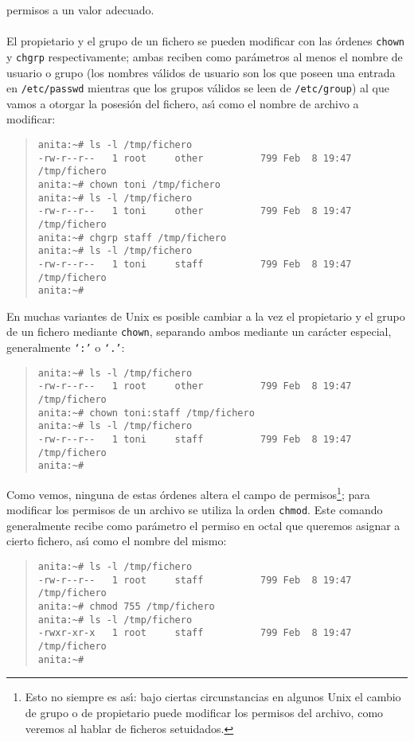 permisos a un valor adecuado.\\
\\El propietario y el grupo de un fichero se pueden modificar con las \'ordenes
{\tt chown} y {\tt chgrp} respectivamente; ambas reciben como par\'ametros al
menos el nombre de usuario o grupo (los nombres v\'alidos de usuario
son los que poseen una entrada en {\tt /etc/passwd} mientras que los grupos
v\'alidos se leen de {\tt /etc/group}) al que vamos a otorgar la posesi\'on
del fichero, as\'{\i} como el nombre de archivo a modificar:
\begin{quote}
\begin{verbatim}
anita:~# ls -l /tmp/fichero 
-rw-r--r--   1 root     other          799 Feb  8 19:47 /tmp/fichero
anita:~# chown toni /tmp/fichero
anita:~# ls -l /tmp/fichero 
-rw-r--r--   1 toni     other          799 Feb  8 19:47 /tmp/fichero
anita:~# chgrp staff /tmp/fichero
anita:~# ls -l /tmp/fichero 
-rw-r--r--   1 toni     staff          799 Feb  8 19:47 /tmp/fichero
anita:~# 
\end{verbatim}
\end{quote}
En muchas variantes de Unix es posible cambiar a la vez el propietario y el
grupo de un fichero mediante {\tt chown}, separando ambos mediante un car\'acter
especial, generalmente {\tt `:'} o {\tt `.'}:
\begin{quote}
\begin{verbatim}
anita:~# ls -l /tmp/fichero 
-rw-r--r--   1 root     other          799 Feb  8 19:47 /tmp/fichero
anita:~# chown toni:staff /tmp/fichero
anita:~# ls -l /tmp/fichero 
-rw-r--r--   1 toni     staff          799 Feb  8 19:47 /tmp/fichero
anita:~#
\end{verbatim}
\end{quote}
Como vemos, ninguna de estas \'ordenes altera el campo de permisos\footnote{Esto
no siempre es as\'{\i}: bajo ciertas circunstancias en algunos Unix el cambio
de grupo o de propietario puede modificar los permisos del archivo, como veremos
al hablar de  ficheros setuidados.}; para modificar los permisos de un archivo
se utiliza la orden {\tt chmod}. Este comando generalmente recibe como 
par\'ametro el permiso en octal que queremos asignar a cierto fichero, as\'{\i}
como el nombre del mismo:
\begin{quote}
\begin{verbatim}
anita:~# ls -l /tmp/fichero 
-rw-r--r--   1 root     staff          799 Feb  8 19:47 /tmp/fichero
anita:~# chmod 755 /tmp/fichero
anita:~# ls -l /tmp/fichero 
-rwxr-xr-x   1 root     staff          799 Feb  8 19:47 /tmp/fichero
anita:~# 
\end{verbatim}
\end{quote}
